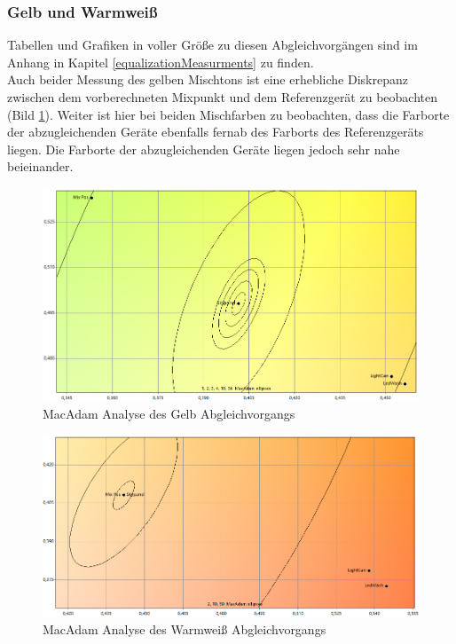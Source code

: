 \documentclass[11pt]{scrartcl}
\begin{document}
\subsubsection{Gelb und Warmweiß}
Tabellen und Grafiken in voller Größe zu diesen Abgleichvorgängen sind im Anhang in Kapitel \ref{equalizationMeasurments} zu
finden.\\
Auch beider Messung des gelben Mischtons ist eine erhebliche Diskrepanz zwischen dem vorberechneten Mixpunkt und dem
Referenzgerät zu beobachten (Bild \ref{fig:macAdamYellow}). Weiter ist hier bei beiden Mischfarben zu beobachten, dass die
Farborte der abzugleichenden Geräte ebenfalls fernab des Farborts des Referenzgeräts liegen. Die Farborte der abzugleichenden
Geräte liegen jedoch sehr nahe beieinander.
\begin{figure}[H]
    \begin{center}
        \includegraphics[width=.8\textwidth]{images/macAdam/comparedYellow.png}
    \end{center}
    \vspace{-10pt}
    \caption{MacAdam Analyse des Gelb Abgleichvorgangs} \label{fig:macAdamYellow}
\end{figure}
\vspace{-10pt}
\begin{figure}[H]
    \begin{center}
        \includegraphics[width=.8\textwidth]{images/macAdam/comparedWarmWhite.png}
    \end{center}
    \vspace{-10pt}
    \caption{MacAdam Analyse des Warmweiß Abgleichvorgangs}
\end{figure}
\end{document}
